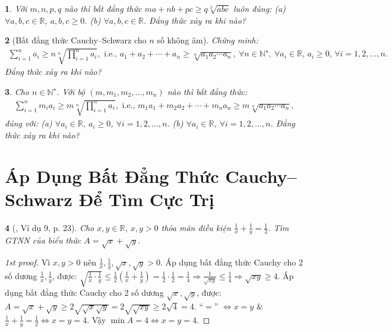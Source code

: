 \documentclass{article}
\newtheorem{baitoan}{}
\begin{document}
\begin{baitoan}
	Với $m,n,p,q$ nào thì bất đẳng thức $ma + nb + pc\ge q\sqrt[3]{abc}$ luôn đúng: (a) $\forall a,b,c\in\mathbb{R}$, $a,b,c\ge0$. (b) $\forall a,b,c\in\mathbb{R}$. Đẳng thức xảy ra khi nào?
\end{baitoan}

\begin{baitoan}[Bất đẳng thức Cauchy--Schwarz cho $n$ số không âm]
	Chứng minh:
	\begin{align*}
		\sum_{i=1}^n a_i\ge n\sqrt[n]{\prod_{i=1}^n a_i},\mbox{ i.e., } a_1 + a_2 + \cdots + a_n\ge\sqrt[n]{a_1a_2\cdots a_n},\ \forall n\in\mathbb{N}^\star,\ \forall a_i\in\mathbb{R},\,a_i\ge0,\,\forall i = 1,2,\ldots,n.
	\end{align*}
	Đẳng thức xảy ra khi nào?
\end{baitoan}

\begin{baitoan}
	Cho $n\in\mathbb{N}^\star$. Với bộ $(m,m_1,m_2,\ldots,m_n)$ nào thì bất đẳng thức:
	\begin{align*}
		\sum_{i=1}^n m_ia_i\ge m\sqrt[n]{\prod_{i=1}^n a_i},\mbox{ i.e., } m_1a_1 + m_2a_2 + \cdots + m_na_n\ge m\sqrt[n]{a_1a_2\cdots a_n},
	\end{align*}
	đúng với: (a) $\forall a_i\in\mathbb{R}$, $a_i\ge0$, $\forall i = 1,2,\ldots,n$. (b) $\forall a_i\in\mathbb{R}$, $\forall i = 1,2,\ldots,n$.
	Đẳng thức xảy ra khi nào?
\end{baitoan}



\section{Áp Dụng Bất Đẳng Thức Cauchy--Schwarz Để Tìm Cực Trị}

\begin{baitoan}[\cite{Tuyen_Toan_9_old}, Ví dụ 9, p. 23]
	Cho $x,y\in\mathbb{R}$, $x,y > 0$ thỏa mãn điều kiện $\frac{1}{x} + \frac{1}{y} = \frac{1}{2}$. Tìm {\rm GTNN} của biểu thức $A = \sqrt{x} + \sqrt{y}$.
\end{baitoan}

\begin{proof}[1st proof]
	Vì $x,y > 0$ nên $\frac{1}{x},\frac{1}{y},\sqrt{x},\sqrt{y} > 0$. Áp dụng bất đẳng thức Cauchy cho 2 số dương $\frac{1}{x},\frac{1}{y}$, được: $\sqrt{\frac{1}{x}\cdot\frac{1}{y}}\le\frac{1}{2}\left(\frac{1}{x} + \frac{1}{y}\right) = \frac{1}{2}\cdot\frac{1}{2} = \frac{1}{4}\Rightarrow\frac{1}{\sqrt{xy}}\le\frac{1}{4}\Rightarrow\sqrt{xy}\ge4$. Áp dụng bất đẳng thức Cauchy cho 2 số dương $\sqrt{x},\sqrt{y}$, được: $A = \sqrt{x} + \sqrt{y}\ge2\sqrt{\sqrt{x}\sqrt{y}} = 2\sqrt{\sqrt{xy}}\ge2\sqrt{4} = 4$. ``$=$'' $\Leftrightarrow x = y$ \& $\frac{1}{x} + \frac{1}{y} = \frac{1}{2}\Leftrightarrow x = y = 4$. Vậy $\min A = 4\Leftrightarrow x = y = 4$.
\end{proof}
\end{document}
